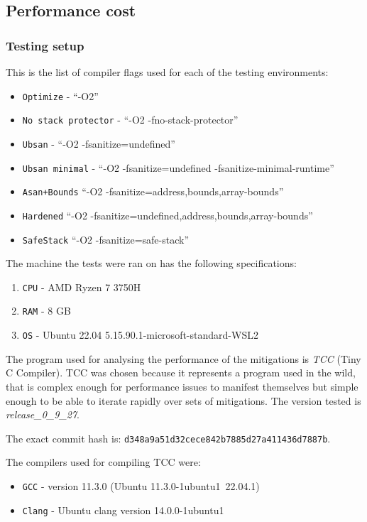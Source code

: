 \documentclass{article}
\begin{document}
\subsection{Performance cost}
\subsubsection{Testing setup}

This is the list of compiler flags used for each of the testing environments:
\begin{itemize}
  \item \texttt{Optimize} - ``-O2''
  \item \texttt{No stack protector} - ``-O2 -fno-stack-protector''
  \item \texttt{Ubsan} - ``-O2 -fsanitize=undefined''
  \item \texttt{Ubsan minimal} - ``-O2 -fsanitize=undefined -fsanitize-minimal-runtime''
  \item \texttt{Asan+Bounds} ``-O2 -fsanitize=address,bounds,array-bounds''
  \item \texttt{Hardened} ``-O2 -fsanitize=undefined,address,bounds,array-bounds''
  \item \texttt{SafeStack} ``-O2 -fsanitize=safe-stack''
\end{itemize}

The machine the tests were ran on has the following specifications:
\begin{enumerate}
  \item \texttt{CPU} - AMD Ryzen 7 3750H
  \item \texttt{RAM} - 8 GB
  \item \texttt{OS} - Ubuntu 22.04 5.15.90.1-microsoft-standard-WSL2
\end{enumerate}

The program used for analysing the performance of the mitigations is \emph{TCC} (Tiny C Compiler). TCC was chosen because it represents a program used in the wild, that is complex enough for performance issues to manifest themselves but simple enough to be able to iterate rapidly over sets of mitigations. The version tested is \emph{release\_0\_9\_27}.

The exact commit hash is: \texttt{d348a9a51d32cece842b7885d27a411436d7887b}.

The compilers used for compiling TCC were:
\begin{itemize}
  \item \texttt{GCC} - version 11.3.0 (Ubuntu 11.3.0-1ubuntu1~22.04.1)
  \item \texttt{Clang} - Ubuntu clang version 14.0.0-1ubuntu1
\end{itemize}
\end{document}
